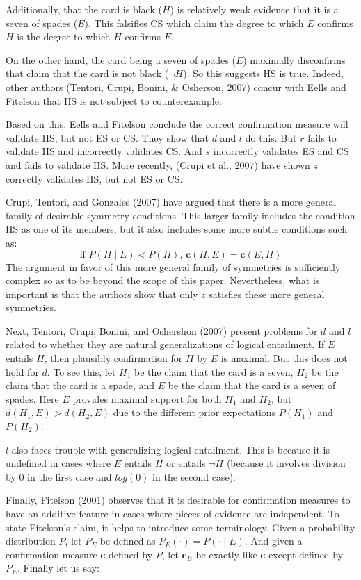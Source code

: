 \documentclass[10pt, letterpaper]{article}
\begin{document}
Additionally, that the card is black (\(H\)) is relatively weak evidence
that it is a seven of spades (\(E\)). This falsifies CS which claim the
degree to which \(E\) confirms \(H\) is the degree to which \(H\)
confirms \(E\).

On the other hand, the card being a seven of spades (\(E\)) maximally
disconfirms that claim that the card is not black (\(\neg H\)). So this
suggests HS is true. Indeed, other authors (Tentori, Crupi, Bonini, \&
Osherson, 2007) concur with Eells and Fitelson that HS is not subject to
counterexample.

Based on this, Eells and Fitelson conclude the correct confirmation
measure will validate HS, but not ES or CS. They show that \(d\) and
\(l\) do this. But \(r\) fails to validate HS and incorrectly validates
CS. And \(s\) incorrectly validates ES and CS and fails to validate HS.
More recently, (Crupi et al., 2007) have shown \(z\) correctly validates
HS, but not ES or CS.

Crupi, Tentori, and Gonzales (2007) have argued that there is a more
general family of desirable symmetry conditions. This larger family
includes the condition HS as one of its members, but it also includes
some more subtle conditions such as:
\[\text{if } P(H \mid E) <P(H)\text{, } \mathbf{c}(H,E)=\mathbf{c}(E,H)\]
The argument in favor of this more general family of symmetries is
sufficiently complex so as to be beyond the scope of this paper.
Nevertheless, what is important is that the authors show that only \(z\)
satisfies these more general symmetries.

Next, Tentori, Crupi, Bonini, and Oshershon (2007) present problems for
\(d\) and \(l\) related to whether they are natural generalizations of
logical entailment. If \(E\) entails \(H\), then plausibly confirmation
for \(H\) by \(E\) is maximal. But this does not hold for \(d\). To see
this, let \(H_1\) be the claim that the card is a seven, \(H_2\) be the
claim that the card is a spade, and \(E\) be the claim that the card is
a seven of spades. Here \(E\) provides maximal support for both \(H_1\)
and \(H_2\), but \(d(H_1,E) > d(H_2, E)\) due to the different prior
expectations \(P(H_1)\) and \(P(H_2)\).

\(l\) also faces trouble with generalizing logical entailment. This is
because it is undefined in cases where \(E\) entails \(H\) or entails
\(\neg H\) (because it involves division by \(0\) in the first case and
\(log(0)\) in the second case).

Finally, Fitelson (2001) observes that it is desirable for confirmation
measures to have an additive feature in cases where pieces of evidence
are independent. To state Fitelson's claim, it helps to introduce some
terminology. Given a probability distribution \(P\), let \(P_E\) be
defined as \(P_E(\cdot)=P(\cdot \mid E)\). And given a confirmation
measure \(\mathbf{c}\) defined by \(P\), let \(\mathbf{c}_E\) be exactly
like \(\mathbf{c}\) except defined by \(P_E\). Finally let us say:
\end{document}
